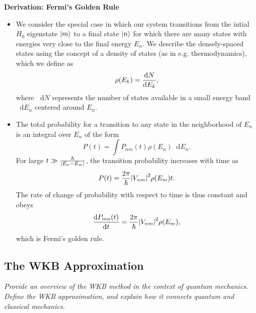 \documentclass[11pt, a4paper]{article}
\newcommand{\diff}{\mathop{}\!\mathrm{d}} %
\begin{document}
\textbf{Derivation: Fermi's Golden Rule}
\begin{itemize}
    \item We consider the special case in which our system transitions from the intial $ H_{0} $ eigenstate $ \ket{m} $ to a final state $ \ket{n} $ for which there are many states with energies very close to the final energy $ E_{n} $. We describe the densely-spaced states using the concept of a density of states (as in e.g. thermodynamics), which we define as
    \begin{equation*}
        \rho(E_{k}) = \dv{N}{E_{k}},
    \end{equation*}
    where $ \diff N $ represents the number of states available in a small energy band $ \diff E_{n} $ centered around $ E_{n} $. 

    \item The total probability for a transition to any state in the neighborhood of $ E_{n} $ is an integral over $ E_{n} $ of the form
    \begin{equation*}
        P(t) = \int P_{nm}(t)\rho(E_{n})\diff E_{n}.
    \end{equation*}
    For large $ t \gg \frac{\hbar}{\abs{E_{n} - E_{m}}} $, the transition probability increases with time as
    \begin{equation*}
        P(t) = \frac{2\pi}{\hbar} \abs{V_{nm}}^{2}\rho(E_{m})t.
    \end{equation*}
    The rate of change of probability with respect to time is thus constant and obeys
    \begin{equation*}
        \dv{P_{mn}(t)}{t} = \frac{2\pi}{\hbar} \abs{V_{nm}}^{2}\rho(E_{m}),
    \end{equation*}
    which is Fermi's golden rule.
    
\end{itemize}


\subsection{The WKB Approximation}
\textit{Provide an overview of the \emph{WKB} method in the context of quantum mechanics. Define the \emph{WKB} approximation, and explain how it connects quantum and classical mechanics.}
\end{document}
